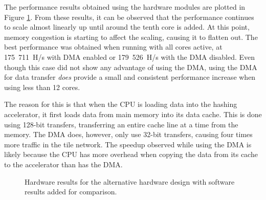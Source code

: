 The performance results obtained using the hardware modules are plotted in Figure \ref{fig:shadmacomp-scaling2}.
From these results, it can be observed that the performance continues to scale almost linearly up until around
the tenth core is added. At this point, memory congestion is starting to affect the scaling, causing it to
flatten out. The best performance was obtained when running with all cores active, at 175~711~H/s with DMA
enabled or 179~526~H/s with the DMA disabled. Even though this case did not show any advantage of using the
DMA, using the DMA for data transfer \emph{does} provide a small and consistent performance increase when using less than 
12 cores.

The reason for this is that when the CPU is loading data into the hashing accelerator, it first loads
data from main memory into its data cache. This is done using 128-bit transfers, transferring an entire
cache line at a time from the memory. The DMA does, however, only use 32-bit transfers, causing four times
more traffic in the tile network. The speedup observed while using the DMA is likely because the CPU has more
overhead when copying the data from its cache to the accelerator than has the DMA.

\begin{figure}
	\centering
	\caption{Hardware results for the alternative hardware design with software results added for comparison.}
	\label{fig:shadmacomp-scaling2}
\end{figure}

